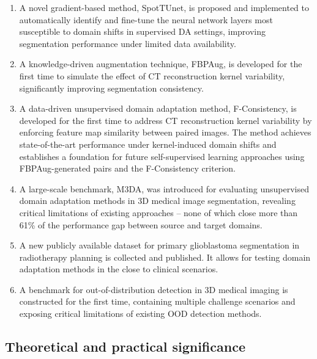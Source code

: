 \begin{enumerate}
    
    \item A novel gradient-based method, SpotTUnet, is proposed and implemented to automatically identify and fine-tune the neural network layers most susceptible to domain shifts in supervised DA settings, improving segmentation performance under limited data availability.
    
    \item A knowledge-driven augmentation technique, FBPAug, is developed for the first time to simulate the effect of CT reconstruction kernel variability, significantly improving segmentation consistency.
    
    \item A data-driven unsupervised domain adaptation method, F-Consistency, is developed for the first time to address CT reconstruction kernel variability by enforcing feature map similarity between paired images. The method achieves state-of-the-art performance under kernel-induced domain shifts and establishes a foundation for future self-supervised learning approaches using FBPAug-generated pairs and the F-Consistency criterion.
    
    \item A large-scale benchmark, M3DA, was introduced for evaluating unsupervised domain adaptation methods in 3D medical image segmentation, revealing critical limitations of existing approaches -- none of which close more than 61\% of the performance gap between source and target domains.
    
    \item A new publicly available dataset for primary glioblastoma segmentation in radiotherapy planning is collected and published. It allows for testing domain adaptation methods in the close to clinical scenarios.
    
    \item A benchmark for out-of-distribution detection in 3D medical imaging is constructed for the first time, containing multiple challenge scenarios and exposing critical limitations of existing OOD detection methods.
    
\end{enumerate}


\subsection*{Theoretical and practical significance}

